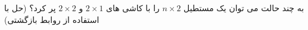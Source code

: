 \exercise
به چند حالت می توان یک مستطیل
$n\times2$
را با کاشی های
$2\times1$
و
$2\times2$
پر کرد؟ (حل با استفاده از روابط بازگشتی)